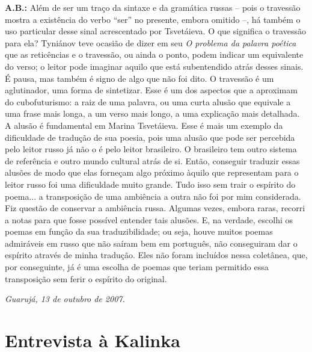 \textbf{A.B.:} Além de ser um traço da sintaxe e da gramática russas --
pois o travessão mostra a existência do verbo ``ser'' no presente,
embora omitido --, há também o uso particular desse sinal acrescentado
por Tsvetáieva. O que significa o travessão para ela? Tyniánov teve
ocasião de dizer em seu \emph{O problema da palavra poética} que as
reticências e o travessão, ou ainda o ponto, podem indicar um
equivalente do verso; o leitor pode imaginar aquilo que está
subentendido atrás desses sinais. É pausa, mas também é signo de algo
que não foi dito. O travessão é um aglutinador, uma forma de sintetizar.
Esse é um dos aspectos que a aproximam do cubofuturismo: a raiz de uma
palavra, ou uma curta alusão que equivale a uma frase mais longa, a um
verso mais longo, a uma explicação mais detalhada. A alusão é
fundamental em Marina Tsvetáieva. Esse é mais um exemplo da dificuldade
de tradução de sua poesia, pois uma alusão que pode ser percebida pelo
leitor russo já não o é pelo leitor brasileiro. O brasileiro tem outro
sistema de referência e outro mundo cultural atrás de si. Então,
conseguir traduzir essas alusões de modo que elas forneçam algo próximo
àquilo que representam para o leitor russo foi uma dificuldade muito
grande. Tudo isso sem trair o espírito do poema... a transposição de uma
ambiência a outra não foi por mim considerada. Fiz questão de conservar
a ambiência russa. Algumas vezes, embora raras, recorri a notas para que
fosse possível entender tais alusões. E, na verdade, escolhi os poemas
em função da sua traduzibilidade; ou seja, houve muitos poemas
admiráveis em russo que não saíram bem em português, não conseguiram dar
o espírito através de minha tradução. Eles não foram incluídos nessa
coletânea, que, por conseguinte, já é uma escolha de poemas que teriam
permitido essa transposição sem ferir o espírito do original.

\emph{Guarujá, 13 de outubro de 2007.}



\chapter{Entrevista à Kalinka}

